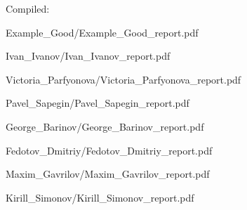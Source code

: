 \documentclass[a4paper]{article}
\begin{document}
Compiled: \DTMnow
\tableofcontents

\clearpage

{Example_Good/Example_Good_report.pdf}

{Ivan_Ivanov/Ivan_Ivanov_report.pdf}

{Victoria_Parfyonova/Victoria_Parfyonova_report.pdf}

{Pavel_Sapegin/Pavel_Sapegin_report.pdf}

{George_Barinov/George_Barinov_report.pdf}

{Fedotov_Dmitriy/Fedotov_Dmitriy_report.pdf}

{Maxim_Gavrilov/Maxim_Gavrilov_report.pdf}

{Kirill_Simonov/Kirill_Simonov_report.pdf}
\end{document}
